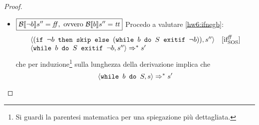 {\begin{enumerate}
\begin{proof}
\begin{itemize}
\begin{itemize}
		In questo caso ottengo che:
		$$
		\begin{array}{ll}
		\confSs{\ifABC{\neg b}{\skipForFriends}{(\wbSE{b}{S}{\neg b})}}{s''} & \ifttSOS \\
		\confSs{\skipForFriends}{s''} & \skipForFriends \\
		s''
		\end{array}
		$$
		da cui per il determinismo delle regole SOS segue che $\boxed{s'' \equiv s'}$. Ma procedendo
		a valutare $\confSs{\wbS{b}{S}}{s}$ ottengo:
		$$
		\begin{array}{ll}
		\confSs{\wbS{b}{S}}{s} \Rar{} & \whileSOS \\
		\confSs{\ifABC{b}{S; \wbS{b}{S}}{\skipForFriends}}{s} & \ifttSOS \\
		\confSs{S; \wbS{b}{S}}{s} \Rar{*} & \text{Lemma di composizione applicato a \ref{hw6:Ssgoestos''}} \\
		\confSs{\wbS{b}{S}}{s''} & \whileSOS \\
		\confSs{\ifABC{b}{S; \wbS{b}{S}}{\skipForFriends}}{s''} & \ifffSOS \\
		\confSs{\skipForFriends}{s''} \Rar{} & \skipSOS \\
		s''
		\end{array}
		$$
		che era proprio ciò che bisognava dimostrare.
		\item $\boxed{\mathcal{B} \llbracket \neg b \rrbracket s'' = \mbox{\textit{ff}}, \text{ ovvero } \mathcal{B} \llbracket b \rrbracket s'' = \mbox{\textit{tt}}}$
		Procedo a valutare \ref{hw6:ifnegb}:
		$$
		\begin{array}{ll}
		\langle{}(\mbox{\normalfont{\texttt{if }}} \neg b \textrm{\normalfont{\texttt{ then }}} \textrm{\normalfont{\texttt{skip}}} \textrm{\normalfont{\texttt{ else }}} (\mbox{\normalfont{\texttt{while }}} b \textrm{\normalfont{\texttt{ do }}} S \textrm{\normalfont{\texttt{ exitif }}} \neg b)), s''\rangle{} &  [ \textrm{\normalfont{if}} ^ \textrm{\normalfont{\ensuremath{\mbox{\textit{ff}}}}} _\textrm{\normalfont{SOS}} ] \\
		\langle{}\mbox{\normalfont{\texttt{while }}} b \textrm{\normalfont{\texttt{ do }}} S \textrm{\normalfont{\texttt{ exitif }}} \neg b, s''\rangle{} \Rightarrow^{*} s'
		\end{array}
		$$
		che per induzione\footnote{Si guardi la parentesi matematica per una spiegazione più dettagliata.} sulla lunghezza della derivazione implica che
		$$
		\langle{}\mbox{\normalfont{\texttt{while }}} b \textrm{\normalfont{\texttt{ do }}} S, s\rangle{} \Rightarrow^{*} s'
		$$
	\end{itemize}
	

\end{itemize}
\end{proof}
\end{enumerate}}
